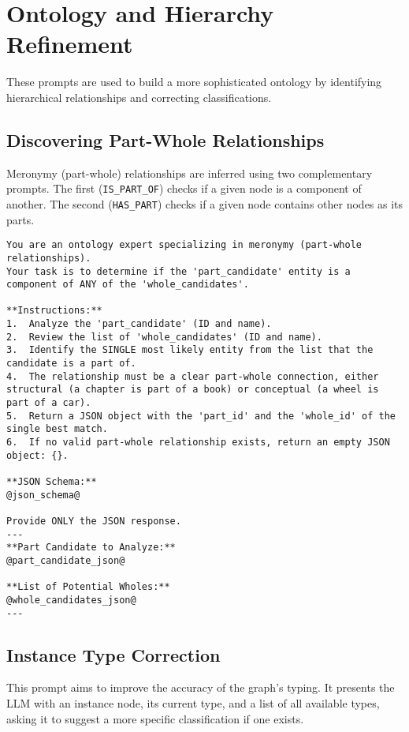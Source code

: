 \section{Ontology and Hierarchy Refinement}
These prompts are used to build a more sophisticated ontology by identifying hierarchical relationships and correcting classifications.

\subsection{Discovering Part-Whole Relationships}
Meronymy (part-whole) relationships are inferred using two complementary prompts. The first (\texttt{IS\_PART\_OF}) checks if a given node is a component of another. The second (\texttt{HAS\_PART}) checks if a given node contains other nodes as its parts.

\begin{lstlisting}[style=promptstyle, caption={Prompt to identify if an entity IS A PART OF another.}, label={lst:prompt_is_part_of}]
You are an ontology expert specializing in meronymy (part-whole relationships).
Your task is to determine if the 'part_candidate' entity is a component of ANY of the 'whole_candidates'.

**Instructions:**
1.  Analyze the 'part_candidate' (ID and name).
2.  Review the list of 'whole_candidates' (ID and name).
3.  Identify the SINGLE most likely entity from the list that the candidate is a part of.
4.  The relationship must be a clear part-whole connection, either structural (a chapter is part of a book) or conceptual (a wheel is part of a car).
5.  Return a JSON object with the 'part_id' and the 'whole_id' of the single best match.
6.  If no valid part-whole relationship exists, return an empty JSON object: {}.

**JSON Schema:**
@json_schema@

Provide ONLY the JSON response.
---
**Part Candidate to Analyze:**
@part_candidate_json@

**List of Potential Wholes:**
@whole_candidates_json@
---
\end{lstlisting}

\subsection{Instance Type Correction}
This prompt aims to improve the accuracy of the graph's typing. It presents the LLM with an instance node, its current type, and a list of all available types, asking it to suggest a more specific classification if one exists.

